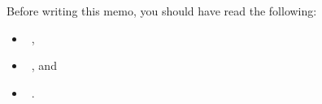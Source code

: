 Before writing this memo, you should have read the following:
\begin{itemize}
  \item {}~\cite{MSB2011itm},
  \item {}~\cite{MSB2011sle}, and
  \item {}~\cite{MSB2011p}.
\end{itemize}
